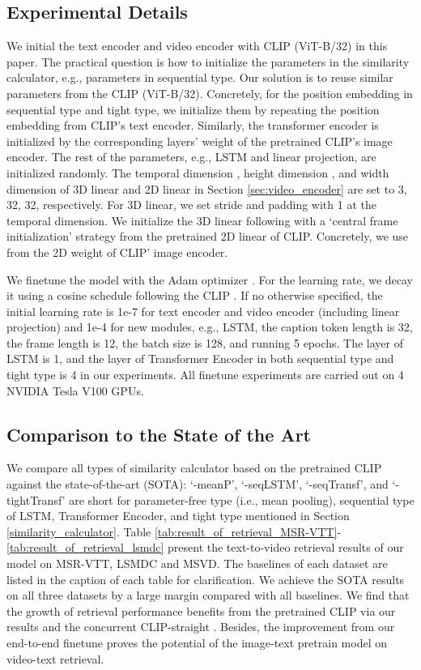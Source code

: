 \documentclass[11pt]{article}
\begin{document}
	\subsection{Experimental Details}
	We initial the text encoder and video encoder with CLIP (ViT-B/32) \cite{radford2021learning} in this paper. The practical
	question is how to initialize the parameters in the similarity calculator, e.g., parameters in sequential type. Our solution is to reuse similar parameters from the CLIP (ViT-B/32). Concretely, for the position embedding in sequential type and tight type, we initialize them by repeating the position embedding from CLIP's text encoder. Similarly, the transformer encoder is initialized by the corresponding layers' weight of the pretrained CLIP's image encoder. The rest of the parameters, e.g., LSTM and linear projection, are initialized randomly. The temporal dimension , height dimension , and width dimension  of 3D linear and 2D linear in Section \ref{sec:video_encoder} are set to 3, 32, 32, respectively. For 3D linear, we set stride and padding with 1 at the temporal dimension. We initialize the 3D linear following \cite{arnab2021vivit} with a `central frame initialization' strategy from the pretrained 2D linear of CLIP. Concretely, we use  from the 2D weight  of CLIP' image encoder.

	We finetune the model with the Adam optimizer \cite{kingma2014adam}. For the learning rate, we decay it using a cosine schedule \cite{Loshchilov2017SGDR} following the CLIP \cite{radford2021learning}. If no otherwise specified, the initial learning rate is 1e-7 for text encoder and video encoder (including linear projection) and 1e-4 for new modules, e.g., LSTM, the caption token length is 32, the frame length is 12, the batch size is 128, and running 5 epochs. The layer of LSTM is 1, and the layer of Transformer Encoder in both sequential type and tight type is 4 in our experiments. All finetune experiments are carried out on 4 NVIDIA Tesla V100 GPUs.

	\subsection{Comparison to the State of the Art}
	We compare all types of similarity calculator based on the pretrained CLIP against the state-of-the-art (SOTA): `-meanP', `-seqLSTM', `-seqTransf', and `-tightTransf' are short for parameter-free type (i.e., mean pooling), sequential type of LSTM, Transformer Encoder, and tight type mentioned in Section \ref{similarity_calculator}. Table \ref{tab:result_of_retrieval_MSR-VTT}-\ref{tab:result_of_retrieval_lsmdc} present the text-to-video retrieval results of our model on MSR-VTT, LSMDC and MSVD. The baselines of each dataset are listed in the caption of each table for clarification. We achieve the SOTA results on all three datasets by a large margin compared with all baselines. We find that the growth of retrieval performance benefits from the pretrained CLIP via our results and the concurrent CLIP-straight \cite{PortilloQuintero2021}. Besides, the improvement from our end-to-end finetune proves the potential of the image-text pretrain model on video-text retrieval.
\end{document}
